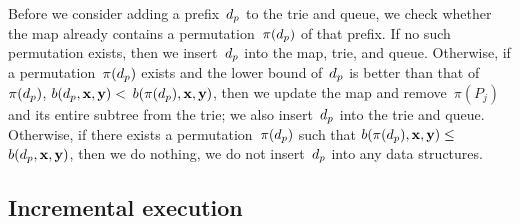 Before we consider adding a prefix~$d_p$ to the trie and queue, we check
whether the map already contains a permutation~$\pi(d_p)$ of that prefix.
%
If no such permutation exists, then we insert~$d_p$ into the map, trie, and queue.
%
Otherwise, if a permutation~$\pi(d_p)$ exists and the lower bound of~$d_p$ is better
than that of~$\pi(d_p)$, \ie ${b(d_p, \mathbf{x}, \mathbf{y}) <}$ ${b(\pi(d_p), \mathbf{x}, \mathbf{y})}$,
then we update the map and remove~$\pi(P_j)$ and its entire subtree from the trie;
we also insert~$d_p$ into the trie and queue.
%
Otherwise, if there exists a permutation~$\pi(d_p)$ such that
${b(\pi(d_p), \mathbf{x}, \mathbf{y}) \le}$ ${b(d_p, \mathbf{x}, \mathbf{y})}$,
then we do nothing, \ie we do not insert~$d_p$ into any data structures.

\subsection{Incremental execution}
\label{sec:execution}

